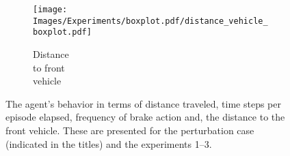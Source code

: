 \begin{figure*}[t]
    \begin{subfigure}{1.11\textwidth}
    \centering
    \begin{minipage}{.7\textwidth}
        \raggedright
        \texttt{[image: Images/Experiments/boxplot.pdf/distance\_vehicle\_boxplot.pdf]}
    \end{minipage}
    \hspace*{-.3cm}
    \begin{minipage}{.3\textwidth}
\centering
        \caption{Distance\\ to front  \\vehicle}
    \end{minipage}
    \end{subfigure}
    \caption{The agent's behavior in terms of distance traveled, time steps per episode elapsed, frequency of brake action and, the distance to the front vehicle. These are presented for the perturbation case (indicated in the titles) and the experiments 1--3.}
    \label{fig:boxplots_comparison}
\end{figure*}